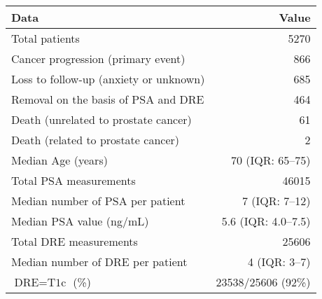 \begin{table}
\captionsetup{justification=justified}
\small\sf\centering

\label{Table1}
\begin{tabular}{lr}
\hline
\hline
Data & Value\\
\hline
Total patients & 5270\\
Cancer progression (primary event) & 866\\
Loss to follow-up (anxiety or unknown) & 685\\
Removal on the basis of PSA and DRE & 464\\
Death (unrelated to prostate cancer) & 61\\
Death (related to prostate cancer) & 2\\
\hline
Median Age (years) & 70 (IQR: 65--75)\\
Total PSA measurements & 46015\\
Median number of PSA per patient &  7 (IQR: 7--12)\\
Median PSA value (ng/mL) & 5.6 (IQR: 4.0--7.5)\\
Total DRE measurements & 25606\\
Median number of DRE per patient & 4 (IQR: 3--7)\\
$\mbox{DRE} = \mbox{T1c}$ (\%) & 23538/25606 (92\%) \\
\hline
\end{tabular}
\end{table}